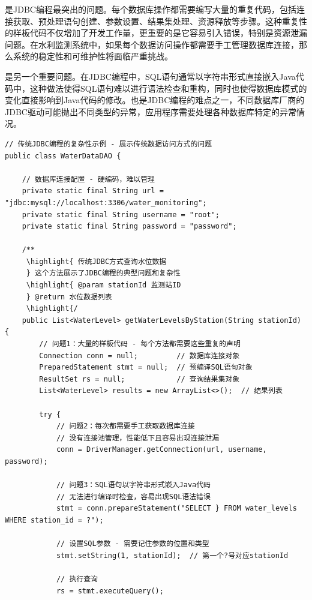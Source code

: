 是JDBC编程最突出的问题。每个数据库操作都需要编写大量的重复代码，包括连接获取、预处理语句创建、参数设置、结果集处理、资源释放等步骤。这种重复性的样板代码不仅增加了开发工作量，更重要的是它容易引入错误，特别是资源泄漏问题。在水利监测系统中，如果每个数据访问操作都需要手工管理数据库连接，那么系统的稳定性和可维护性将面临严重挑战。

是另一个重要问题。在JDBC编程中，SQL语句通常以字符串形式直接嵌入Java代码中，这种做法使得SQL语句难以进行语法检查和重构，同时也使得数据库模式的变化直接影响到Java代码的修改。也是JDBC编程的难点之一，不同数据库厂商的JDBC驱动可能抛出不同类型的异常，应用程序需要处理各种数据库特定的异常情况。

\begin{lstlisting}[style=java]
// 传统JDBC编程的复杂性示例 - 展示传统数据访问方式的问题
public class WaterDataDAO {
    
    // 数据库连接配置 - 硬编码，难以管理
    private static final String url = "jdbc:mysql://localhost:3306/water_monitoring";
    private static final String username = "root";
    private static final String password = "password";
    
    /**
     \highlight{ 传统JDBC方式查询水位数据
     } 这个方法展示了JDBC编程的典型问题和复杂性
     \highlight{ @param stationId 监测站ID
     } @return 水位数据列表
     \highlight{/
    public List<WaterLevel> getWaterLevelsByStation(String stationId) {
        // 问题1：大量的样板代码 - 每个方法都需要这些重复的声明
        Connection conn = null;         // 数据库连接对象
        PreparedStatement stmt = null;  // 预编译SQL语句对象
        ResultSet rs = null;            // 查询结果集对象
        List<WaterLevel> results = new ArrayList<>();  // 结果列表
        
        try {
            // 问题2：每次都需要手工获取数据库连接
            // 没有连接池管理，性能低下且容易出现连接泄漏
            conn = DriverManager.getConnection(url, username, password);
            
            // 问题3：SQL语句以字符串形式嵌入Java代码
            // 无法进行编译时检查，容易出现SQL语法错误
            stmt = conn.prepareStatement("SELECT } FROM water_levels WHERE station_id = ?");
            
            // 设置SQL参数 - 需要记住参数的位置和类型
            stmt.setString(1, stationId);  // 第一个?号对应stationId
            
            // 执行查询
            rs = stmt.executeQuery();
            

\end{lstlisting}

